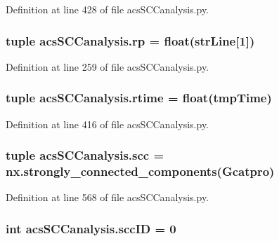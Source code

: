 Definition at line 428 of file acs\+S\+C\+Canalysis.\+py.

\hypertarget{a00130_a98150f532e09ebae495212500d2f1799}{
\subsubsection[{rp}]{\setlength{\rightskip}{0pt plus 5cm}tuple acs\+S\+C\+Canalysis.\+rp = float({\bf str\+Line}\mbox{[}1\mbox{]})}}\label{a00130_a98150f532e09ebae495212500d2f1799}


Definition at line 259 of file acs\+S\+C\+Canalysis.\+py.

\hypertarget{a00130_a162a08b0497058c76e7e885c03a01336}{
\subsubsection[{rtime}]{\setlength{\rightskip}{0pt plus 5cm}tuple acs\+S\+C\+Canalysis.\+rtime = float(tmp\+Time)}}\label{a00130_a162a08b0497058c76e7e885c03a01336}


Definition at line 416 of file acs\+S\+C\+Canalysis.\+py.

\hypertarget{a00130_a2094b7f0917a16a948a2d1c4d700e84c}{
\subsubsection[{scc}]{\setlength{\rightskip}{0pt plus 5cm}tuple acs\+S\+C\+Canalysis.\+scc = nx.\+strongly\+\_\+connected\+\_\+components({\bf Gcatpro})}}\label{a00130_a2094b7f0917a16a948a2d1c4d700e84c}


Definition at line 568 of file acs\+S\+C\+Canalysis.\+py.

\hypertarget{a00130_a1dd3c43841ba4485a66889600f099a0c}{
\subsubsection[{scc\+I\+D}]{\setlength{\rightskip}{0pt plus 5cm}int acs\+S\+C\+Canalysis.\+scc\+I\+D = 0}}\label{a00130_a1dd3c43841ba4485a66889600f099a0c}



